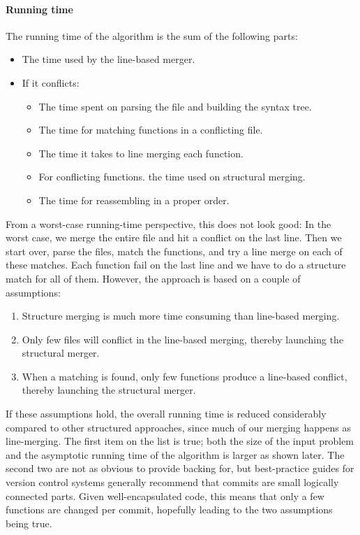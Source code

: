 \documentclass[11pt]{article}
\begin{document}
\paragraph{Running time} The running time of the algorithm is the sum of the following parts:

\begin{itemize}
\item The time used by the line-based merger.
\item If it conflicts:
\begin{itemize}
\item The time spent on parsing the file and building the syntax tree.
\item The time for matching functions in a conflicting file.
\item The time it takes to line merging each function.
\item For conflicting functions. the time used on structural merging.
\item The time for reassembling in a proper order.
\end{itemize}
\end{itemize}

From a worst-case running-time perspective, this does not look good: In the worst case, we merge the entire file and hit a conflict on the last line. Then we start over, parse the files, match the functions, and try a line merge on each of these matches. Each function fail on the last line and we have to do a structure match for all of them. However, the approach is based on a couple of assumptions:

\begin{enumerate}
	\item Structure merging is much more time consuming than line-based merging.
	\item Only few files will conflict in the line-based merging, thereby launching the structural merger.
	\item When a matching is found, only few functions produce a line-based conflict, thereby launching the structural merger.
\end{enumerate}

If these assumptions hold, the overall running time is reduced considerably compared to other structured approaches, since much of our merging happens as line-merging. The first item on the list is true; both the size of the input problem and the asymptotic running time of the algorithm is larger as shown later. The second two are not as obvious to provide backing for, but best-practice guides for version control systems generally recommend that commits are small logically connected parts. Given well-encapsulated code, this means that only a few functions are changed per commit, hopefully leading to the  two assumptions being true.
\end{document}
